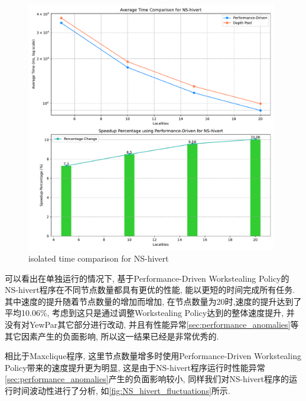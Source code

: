 \documentclass{mproj}
\begin{document}
\begin{figure}[h]
    \centering %
    \includegraphics[width=0.98\textwidth]{images/time_comparison_ns_solo.pdf} %
    \caption{isolated time comparison for NS-hivert} %
    \label{fig:time_comparison_ns_solo} %
\end{figure}
\FloatBarrier

可以看出在单独运行的情况下,
基于Performance-Driven Workstealing Policy的NS-hivert程序在不同节点数量都具有更优的性能,
能以更短的时间完成所有任务.
其中速度的提升随着节点数量的增加而增加,
在节点数量为20时,速度的提升达到了平均10.06\%,
考虑到这只是通过调整Workstealing Policy达到的整体速度提升,
并没有对YewPar其它部分进行改动,
并且有性能异常\ref{sec:performance_anomalies}等其它因素产生的负面影响,
所以这一结果已经是非常优秀的.

相比于Maxclique程序,
这里节点数量增多时使用Performance-Driven Workstealing Policy带来的速度提升更为明显,
这是由于NS-hivert程序运行时性能异常\ref{sec:performance_anomalies}产生的负面影响较小,
同样我们对NS-hivert程序的运行时间波动性进行了分析,
如\cref{fig:NS_hivert_fluctuations}所示.
\end{document}
